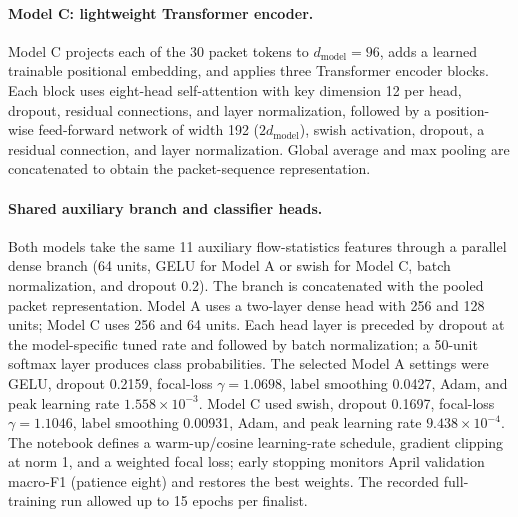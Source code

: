 \documentclass[conference]{IEEEtran}
\begin{document}
\paragraph{Model C: lightweight Transformer encoder.}
Model C projects each of the 30 packet tokens to $d_{\mathrm{model}}=96$, adds a learned trainable positional embedding, and applies three Transformer encoder blocks. Each block uses eight-head self-attention with key dimension 12 per head, dropout, residual connections, and layer normalization, followed by a position-wise feed-forward network of width 192 ($2d_{\mathrm{model}}$), swish activation, dropout, a residual connection, and layer normalization. Global average and max pooling are concatenated to obtain the packet-sequence representation.

\paragraph{Shared auxiliary branch and classifier heads.}
Both models take the same 11 auxiliary flow-statistics features through a parallel dense branch (64 units, GELU for Model A or swish for Model C, batch normalization, and dropout 0.2). The branch is concatenated with the pooled packet representation. Model A uses a two-layer dense head with 256 and 128 units; Model C uses 256 and 64 units. Each head layer is preceded by dropout at the model-specific tuned rate and followed by batch normalization; a 50-unit softmax layer produces class probabilities. The selected Model A settings were GELU, dropout 0.2159, focal-loss $\gamma=1.0698$, label smoothing 0.0427, Adam, and peak learning rate $1.558\times10^{-3}$. Model C used swish, dropout 0.1697, focal-loss $\gamma=1.1046$, label smoothing 0.00931, Adam, and peak learning rate $9.438\times10^{-4}$. The notebook defines a warm-up/cosine learning-rate schedule, gradient clipping at norm 1, and a weighted focal loss; early stopping monitors April validation macro-F1 (patience eight) and restores the best weights. The recorded full-training run allowed up to 15 epochs per finalist.
\end{document}
